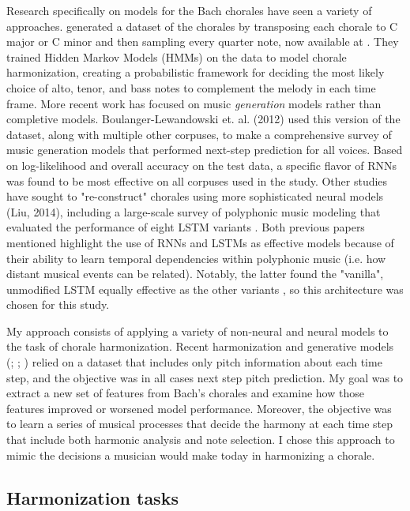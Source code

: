 \documentclass[11pt]{article}
\begin{document}
Research specifically on models for the Bach chorales have seen a variety of approaches. \citet{allan2005harmonising} generated a dataset of the chorales by transposing each chorale to C major or C minor and then sampling every quarter note, now available at \JSBChorales. They trained Hidden Markov Models (HMMs) on the data to model chorale harmonization, creating a probabilistic framework for deciding the most likely choice of alto, tenor, and bass notes to complement the melody in each time frame. More recent work has focused on music \textit{generation} models rather than completive models. Boulanger-Lewandowski et. al. (2012) used this version of the dataset, along with multiple other corpuses, to make a comprehensive survey of music generation models that performed next-step prediction for all voices. Based on log-likelihood and overall accuracy on the test data, a specific flavor of RNNs was found to be most effective on all corpuses used in the study. Other studies have sought to "re-construct" chorales using more sophisticated neural models (Liu, 2014), including a large-scale survey of polyphonic music modeling that evaluated the performance of eight LSTM variants \citet{greff2015lstm}. Both previous papers mentioned highlight the use of RNNs and LSTMs as effective models because of their ability to learn temporal dependencies within polyphonic music (i.e. how distant musical events can be related). Notably, the latter found the "vanilla", unmodified LSTM equally effective as the other variants \citep[p.~7]{greff2015lstm}, so this architecture was chosen for this study.

My approach consists of applying a variety of non-neural and neural models to the task of chorale harmonization. Recent harmonization and generative models (\cite{allan2005harmonising}; \cite{kaliakatsos2014}; \cite{greff2015lstm}) relied on a dataset that includes only pitch information about each time step, and the objective was in all cases next step pitch prediction. My goal was to extract a new set of features from Bach's chorales and examine how those features improved or worsened model performance. Moreover, the objective was to learn a series of musical processes that decide the harmony at each time step that include both harmonic analysis and note selection. I chose this approach to mimic the decisions a musician would make today in harmonizing a chorale.

\subsection{Harmonization tasks}
\end{document}
